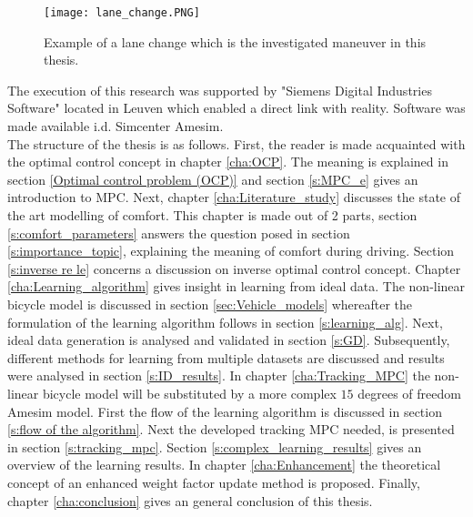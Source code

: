 \begin{figure}[htp]
	\centering
	\texttt{[image: lane\_change.PNG]}
	\caption{Example of a lane change which is the investigated maneuver in this thesis.}
	\label{fig:lane_change}
\end{figure}

The execution of this research was supported by "Siemens Digital Industries Software" located in Leuven which enabled a direct link with reality. Software was made available i.d. Simcenter Amesim.\\

The structure of the thesis is as follows. First, the reader is made acquainted with the optimal control concept in chapter \ref{cha:OCP}. The meaning is explained in section \ref{Optimal control problem (OCP)} and section \ref{s:MPC_e} gives an introduction to MPC. Next, chapter \ref{cha:Literature_study} discusses the state of the art modelling of comfort. This chapter is made out of 2 parts, section \ref{s:comfort_parameters} answers the question posed in section \ref{s:importance_topic}, explaining the meaning of comfort during driving. Section \ref{s:inverse re le} concerns a discussion on inverse optimal control concept. Chapter \ref{cha:Learning_algorithm} gives insight in learning from ideal data. The non-linear bicycle model is discussed in section \ref{sec:Vehicle_models} whereafter the formulation of the learning algorithm follows in section \ref{s:learning_alg}. Next, ideal data generation is analysed and validated in section \ref{s:GD}. Subsequently, different methods for learning from multiple datasets are discussed and results were analysed in section \ref{s:ID_results}. In chapter \ref{cha:Tracking_MPC} the non-linear bicycle model will be substituted by a more complex $15$ degrees of freedom Amesim model. First the flow of the learning algorithm is discussed in section \ref{s:flow of the algorithm}. Next the developed tracking MPC needed, is presented in section \ref{s:tracking_mpc}. Section \ref{s:complex_learning_results} gives an overview of the learning results. 
In chapter \ref{cha:Enhancement} the theoretical concept of an enhanced weight factor update method is proposed. Finally, chapter \ref{cha:conclusion} gives an general conclusion of this thesis.


